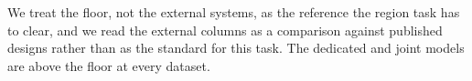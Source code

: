 We treat the floor, not the external systems, as the reference the
region task has to clear, and we read the external columns as a comparison against
published designs rather than as the standard for this task. The dedicated and joint
models are above the floor at every dataset.
